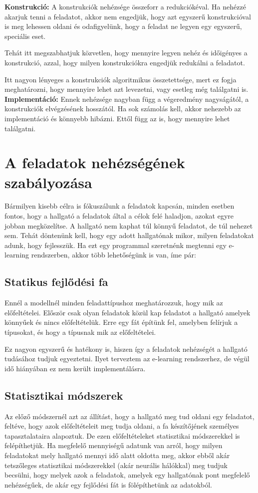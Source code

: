 \documentclass[12pt]{report}
\theoremstyle{definition}
\begin{document}
\textbf{Konstrukció:} A konstrukciók nehézsége összeforr a redukciókéval. Ha nehézzé akarjuk tenni a feladatot, akkor nem engedjük, hogy azt egyszerű konstrukcióval is meg lehessen oldani és odafigyelünk, hogy a feladat ne legyen egy egyszerű, speciális eset.

Tehát itt megszabhatjuk közvetlen, hogy mennyire legyen nehéz és időigényes a konstrukció, azzal, hogy milyen konstrukciókra engedjük redukálni a feladatot.

Itt nagyon lényeges a konstrukciók algoritmikus összetettsége, mert ez fogja meghatározni, hogy mennyire lehet azt levezetni, vagy esetleg még találgatni is.\\

\textbf{Implementáció:} Ennek nehézsége nagyban függ a végeredmény nagyságától, a konstrukciók elvégzésének hosszától. Ha sok számolás kell, akkor nehezebb az implementáció és könnyebb hibázni. Ettől függ az is, hogy mennyire lehet találgatni.
 
\section{A feladatok nehézségének szabályozása}
Bármilyen kisebb célra is fókuszálunk a feladatok kapcsán, minden esetben fontos, hogy a hallgató a feladatok által a célok felé haladjon, azokat egyre jobban megközelítse. A hallgató nem kaphat túl könnyű feladatot, de túl nehezet sem. Tehát döntenünk kell, hogy egy adott hallgatónak mikor, milyen feladatokat adunk, hogy fejlesszük. Ha ezt egy programmal szeretnénk megtenni egy e-learning rendszerben, akkor több lehetőségünk is van, íme pár:

\subsection{Statikus fejlődési fa}
Ennél a modellnél minden feladattípushoz meghatározzuk, hogy mik az előfeltételei. Először csak olyan feladatok közül kap feladatot a hallgató amelyek könnyűek és nincs előfeltételük. Erre egy fát építünk fel, amelyben felírjuk a típusokat, és hogy a típusnak mik az előfeltételei.

Ez nagyon egyszerű és hatékony is, hiszen így a feladatok nehézségét a hallgató tudásához tudjuk egyeztetni. Ilyet terveztem az e-learning rendszerhez, de végül idő hiányában ez nem került implementálásra.

\subsection{Statisztikai módszerek}
Az előző módszernél azt az állítást, hogy a hallgató meg tud oldani egy feladatot, feltéve, hogy azok előfeltételeit meg tudja oldani, a fa készítőjének személyes tapasztalataira alapoztuk. De ezen előfeltételeket statisztikai módszerekkel is felépíthetjük. Ha megfelelő mennyiségű adatunk van arról, hogy milyen feladatokat mely hallgató mennyi idő alatt oldotta meg, akkor ebből akár tetszőleges statisztikai módszerekkel (akár neurális hálókkal) meg tudjuk becsülni, hogy melyek azok a feladatok, amelyek egy hallgatónak pont megfelelő nehézségűek, de akár egy fejlődési fát is fölépíthetünk az adatokból.
\end{document}
